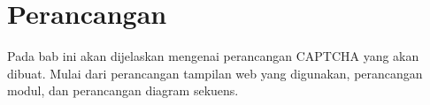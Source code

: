 \chapter{Perancangan}
\label{chap:perancangan}

Pada bab ini akan dijelaskan mengenai perancangan CAPTCHA yang akan dibuat. Mulai dari perancangan tampilan web yang digunakan, perancangan modul, dan perancangan diagram sekuens.











